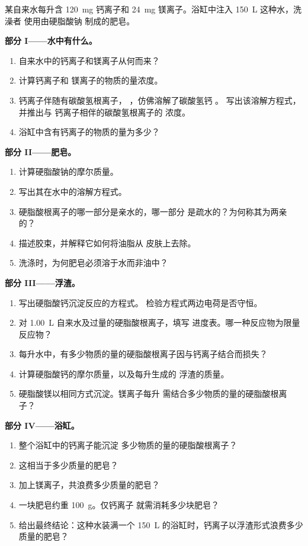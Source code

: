 \begin{problem}
\label{pb:g11:dissolution:1}
某自来水每升含 \qty{120}{mg} 钙离子和 \qty{24}{mg}
镁离子。浴缸中注入 \qty{150}{L} 这种水，洗澡者
使用由硬脂酸钠  制成的肥皂。

\medskip
\noindent\textbf{部分 I——水中有什么。}
\begin{enumerate}
  \item 自来水中的钙离子和镁离子从何而来？
  \item 计算钙离子和
        镁离子的物质的量浓度。
  \item 钙离子伴随有碳酸氢根离子，
        ，仿佛溶解了碳酸氢钙 。
        写出该溶解方程式，并推出与
        钙离子相伴的碳酸氢根离子的
        浓度。
  \item 浴缸中含有钙离子的物质的量为多少？
\end{enumerate}

\medskip
\noindent\textbf{部分 II——肥皂。}
\begin{enumerate}[resume]
  \item 计算硬脂酸钠的摩尔质量。
  \item 写出其在水中的溶解方程式。
  \item 硬脂酸根离子的哪一部分是亲水的，哪一部分
        是疏水的？为何称其为两亲的？
  \item 描述胶束，并解释它如何将油脂从
        皮肤上去除。
  \item 洗涤时，为何肥皂必须溶于水而非油中？
\end{enumerate}

\medskip
\noindent\textbf{部分 III——浮渣。}
\begin{enumerate}[resume]
  \item 写出硬脂酸钙沉淀反应的方程式。
        检验方程式两边电荷是否守恒。
  \item 对 \qty{1.00}{L} 自来水及过量的硬脂酸根离子，填写
        进度表。哪一种反应物为限量反应物？
  \item 每升水中，有多少物质的量的硬脂酸根离子因与钙离子结合而损失？
  \item 计算硬脂酸钙的摩尔质量，以及每升生成的
        浮渣的质量。
  \item 硬脂酸镁以相同方式沉淀。镁离子每升
        需结合多少物质的量的硬脂酸根离子？
\end{enumerate}

\medskip
\noindent\textbf{部分 IV——浴缸。}
\begin{enumerate}[resume]
  \item 整个浴缸中的钙离子能沉淀
        多少物质的量的硬脂酸根离子？
  \item 这相当于多少质量的肥皂？
  \item 加上镁离子，共浪费多少质量的肥皂？
  \item 一块肥皂约重 \qty{100}{g}。仅钙离子
        就需消耗多少块肥皂？
  \item 给出最终结论：这种水装满一个
        \qty{150}{L} 的浴缸时，钙离子以浮渣形式浪费多少质量的肥皂？
\end{enumerate}
\end{problem}
